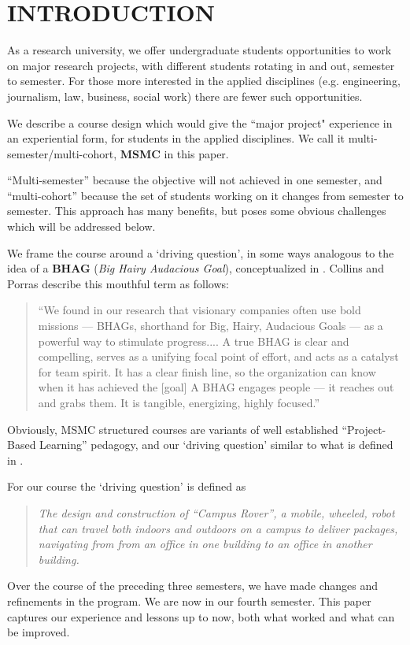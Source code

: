 \section{INTRODUCTION}

As a research university, we offer undergraduate students opportunities to work on major research projects, with different students rotating in and out, semester to semester. For those more interested in the applied disciplines (e.g. engineering, journalism, law, business, social work) there are fewer such opportunities.

We describe a course design which would give the ``major project" experience in an experiential form, for students in the applied disciplines. We call it multi-semester/multi-cohort, \textbf{MSMC} in this paper.

``Multi-semester'' because the objective will not achieved in one semester, and ``multi-cohort'' because the set of students working on it changes from semester to semester. This approach has many benefits, but poses some obvious challenges which will be addressed below.

We frame the course around a `driving question', in some ways analogous to the idea of a \textbf{BHAG} (\textit{Big Hairy Audacious Goal}), conceptualized in \cite{Collins}. Collins and Porras describe this mouthful term as follows:

\begin{quote}
``We found in our research that visionary companies often use bold missions --- BHAGs, shorthand for Big, Hairy, Audacious Goals --- as a powerful way to stimulate progress.... A true BHAG is clear and compelling, serves as a unifying focal point of effort, and acts as a catalyst for team spirit. It has a clear finish line, so the organization can know when it has achieved the [goal] A BHAG engages people --- it reaches out and grabs them. It is tangible, energizing, highly focused.\cite{Collins}''
\end{quote}

Obviously, MSMC structured courses are variants of well established ``Project-Based Learning'' pedagogy\cite{projects}, and our `driving question' similar to what is defined in \cite{blumenfeld}. 

For our course the `driving question' is defined as 

\begin{quote}\textit{The design and construction of ``Campus Rover'', a mobile, wheeled, robot that can travel both indoors and outdoors on a campus to deliver packages, navigating from from an office in one building to an office in another building.}
\end{quote}

Over the course of the preceding three semesters, we have made changes and refinements in the program. We are now in our fourth semester. This paper captures our experience and lessons up to now, both what worked and what can be improved.

